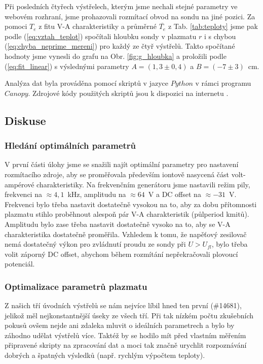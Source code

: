 \documentclass[english]{article}
\begin{document}
			Při posledních čtyřech výstřelech, kterým jsme nechali stejné parametry ve webovém rozhraní, jsme prohazovali rozmítací obvod na sondu na jiné pozici. Za pomoci $T_e$ z fitu V-A charakteristiky a průměrné $\overline{T_e}$ z Tab. \ref{tab:teploty} jsme pak podle (\ref{eq:vztah_teplot}) spočítali hloubku sondy v plazmatu $r$ i s chybou (\ref{eq:chyba_neprime_mereni}) pro každý ze čtyř výstřelů. Takto spočítané hodnoty jsme vynesli do grafu na Obr. \ref{fig:g_hloubka} a proložili podle (\ref{eq:fit_linear}) s výslednými parametry $A=(1,3\pm0,4)$ a $B=(-7\pm3)$~cm. 
			
			Analýza dat byla prováděna pomocí skriptů v jazyce $Python$ v rámci programu $Canopy$. Zdrojové kódy použitých skriptů jsou k dispozici na internetu \cite{bib:repo}.
			
	\subsection{Diskuse}
			\subsubsection{Hledání optimálních parametrů}
					V první části úlohy jsme se snažili najít optimální parametry pro nastavení rozmítacího zdroje, aby se proměřovala především iontově nasycená část volt-ampérové charakteristiky. Na frekvenčním generátoru jsme nastavili režim pily, frekvenci na $\approx4,1$~kHz, amplitudu na $\approx64$~V a DC offset na $\approx-31$~V. Frekvenci bylo třeba nastavit dostatečně vysokou na to, aby za dobu přítomnosti plazmatu stihlo proběhnout alespoň pár V-A charakteristik (půlperiod kmitů). Amplitudu bylo zase třeba nastavit dostatečně vysoko na to, aby se V-A charakteristika dostatečně proměřila. Vzhledem k tomu, že napěťový zesilovač nemá dostatečný výkon pro zvládnutí proudu ze sondy při $U>U_{fl}$, bylo třeba volit záporný DC offset, abychom během rozmítání nepřekračovali plovoucí potenciál.
			
			\subsubsection{Optimalizace parametrů plazmatu}
					Z našich tří úvodních výstřelů se nám nejvíce líbil hned ten první (\#14681), jelikož měl nejkonstantnější úseky ze všech tří. Při tak nízkém počtu zkušebních pokusů ovšem nejde ani zdaleka mluvit o ideálních parametrech a bylo by záhodno udělat výstřelů více. Taktéž by se hodilo mít před vlastním měřením připravené skripty na zpracování dat a moci tak značně urychlit rozpoznávání dobrých a špatných výsledků (např. rychlým výpočtem teploty).
			
\end{document}
